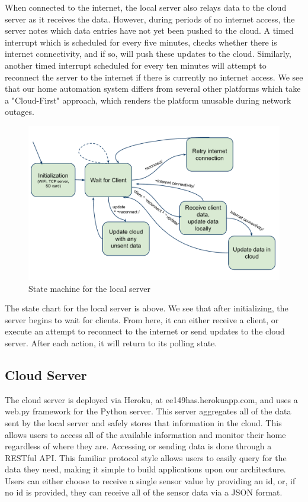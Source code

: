 \documentclass[10pt,twocolumn]{article}
\begin{document}
When connected to the internet, the local server also relays data to the cloud server as it receives the data. However, during periods of no internet access, the server notes which data entries have not yet been pushed to the cloud. A timed interrupt which is scheduled for every five minutes, checks whether there is internet connectivity, and if so, will push these updates to the cloud. Similarly, another timed interrupt scheduled for every ten minutes will attempt to reconnect the server to the internet if there is currently no internet access. We see that our home automation system differs from several other platforms which take a "Cloud-First" approach, which renders the platform unusable during network outages.
\begin{figure}[h]
  \centering
    \includegraphics[scale=0.35]{localserversm.png}
  \caption{State machine for the local server}
  \label{fig:local_server_sm}
\end{figure}

The state chart for the local server is above. We see that after initializing, the server begins to wait for clients. From here, it can either receive a client, or execute an attempt to reconnect to the internet or send updates to the cloud server. After each action, it will return to its polling state.
\subsection*{Cloud Server}
The cloud server is deployed via Heroku, at ee149has.herokuapp.com, and uses a web.py framework for the Python server. This server aggregates all of the data sent by the local server and safely stores that information in the cloud. This allows users to access all of the available information and monitor their home regardless of where they are. Accessing or sending data is done through a RESTful API. This familiar protocol style allows users to easily query for the data they need, making it simple to build applications upon our architecture. Users can either choose to receive a single sensor value by providing an id, or, if no id is provided, they can receive all of the sensor data via a JSON format. 
\end{document}

